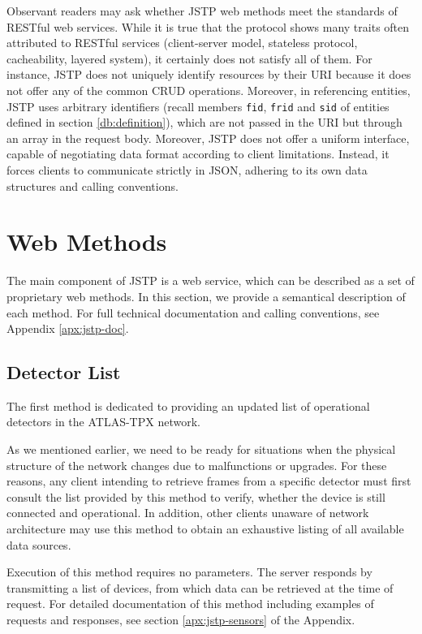 Observant readers may ask whether JSTP web methods meet the standards of RESTful web services. While it is true that the protocol shows many traits often attributed to RESTful services (client-server model, stateless protocol, cacheability, layered system), it certainly does not satisfy all of them. For instance, JSTP does not uniquely identify resources by their URI because it does not offer any of the common CRUD operations. Moreover, in referencing entities, JSTP uses arbitrary identifiers (recall members \texttt{fid}, \texttt{frid} and \texttt{sid} of entities defined in section \ref{db:definition}), which are not passed in the URI but through an array in the request body. Moreover, JSTP does not offer a uniform interface, capable of negotiating data format according to client limitations. Instead, it forces clients to communicate strictly in JSON, adhering to its own data structures and calling conventions.

\section{Web Methods}
The main component of JSTP is a web service, which can be described as a set of proprietary web methods. In this section, we provide a semantical description of each method. For full technical documentation and calling conventions, see Appendix \ref{apx:jstp-doc}.

\subsection{Detector List}
The first method is dedicated to providing an updated list of operational detectors in the ATLAS-TPX network.

As we mentioned earlier, we need to be ready for situations when the physical structure of the network changes due to malfunctions or upgrades. For these reasons, any client intending to retrieve frames from a specific detector must first consult the list provided by this method to verify, whether the device is still connected and operational. In addition, other clients unaware of network architecture may use this method to obtain an exhaustive listing of all available data sources.

Execution of this method requires no parameters. The server responds by transmitting a list of devices, from which data can be retrieved at the time of request. For detailed documentation of this method including examples of requests and responses, see section \ref{apx:jstp-sensors} of the Appendix.

